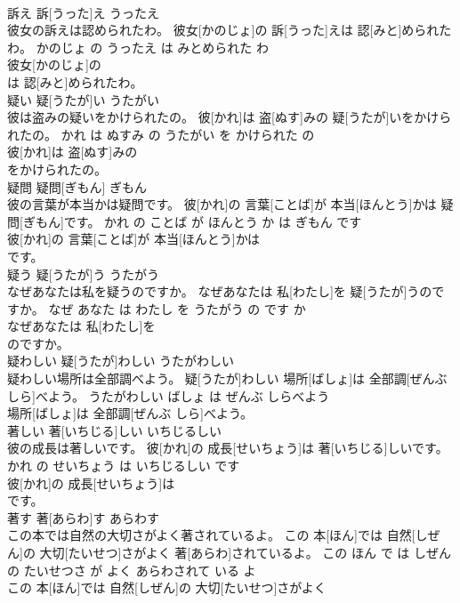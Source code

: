 \documentclass[8pt]{extreport}
\begin{document}
\begin{CJK}{UTF8}{min}
\\	訴え	訴[うった]え	うったえ	
\\	彼女の訴えは認められたわ。	彼女[かのじょ]の 訴[うった]えは 認[みと]められたわ。	かのじょ の うったえ は みとめられた わ	
\\	彼女[かのじょ]の
\\	は 認[みと]められたわ。			
\\	疑い	疑[うたが]い	うたがい	
\\	彼は盗みの疑いをかけられたの。	彼[かれ]は 盗[ぬす]みの 疑[うたが]いをかけられたの。	かれ は ぬすみ の うたがい を かけられた の	
\\	彼[かれ]は 盗[ぬす]みの
\\	をかけられたの。			
\\	疑問	疑問[ぎもん]	ぎもん	
\\	彼の言葉が本当かは疑問です。	彼[かれ]の 言葉[ことば]が 本当[ほんとう]かは 疑問[ぎもん]です。	かれ の ことば が ほんとう か は ぎもん です	
\\	彼[かれ]の 言葉[ことば]が 本当[ほんとう]かは
\\	です。			
\\	疑う	疑[うたが]う	うたがう	
\\	なぜあなたは私を疑うのですか。	なぜあなたは 私[わたし]を 疑[うたが]うのですか。	なぜ あなた は わたし を うたがう の です か	
\\	なぜあなたは 私[わたし]を
\\	のですか。			
\\	疑わしい	疑[うたが]わしい	うたがわしい	
\\	疑わしい場所は全部調べよう。	疑[うたが]わしい 場所[ばしょ]は 全部調[ぜんぶ しら]べよう。	うたがわしい ばしょ は ぜんぶ しらべよう	
\\	場所[ばしょ]は 全部調[ぜんぶ しら]べよう。			
\\	著しい	著[いちじる]しい	いちじるしい	
\\	彼の成長は著しいです。	彼[かれ]の 成長[せいちょう]は 著[いちじる]しいです。	かれ の せいちょう は いちじるしい です	
\\	彼[かれ]の 成長[せいちょう]は
\\	です。			
\\	著す	著[あらわ]す	あらわす	
\\	この本では自然の大切さがよく著されているよ。	この 本[ほん]では 自然[しぜん]の 大切[たいせつ]さがよく 著[あらわ]されているよ。	この ほん で は しぜん の たいせつさ が よく あらわされて いる よ	
\\	この 本[ほん]では 自然[しぜん]の 大切[たいせつ]さがよく

\end{CJK}
\end{document}
